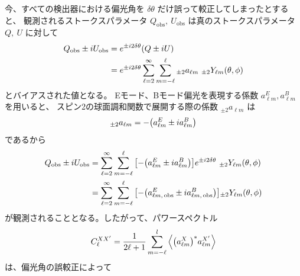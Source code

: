 \documentclass[../../main.tex]{subfiles}
\begin{document}
今、すべての検出器における偏光角を $\delta \theta$ だけ誤って較正してしまったとすると、
観測されるストークスパラメータ $Q_{\mathrm{obs}},\ U_{\mathrm{obs}}$ は真のストークスパラメータ $Q,\ U$ に対して
\begin{align}
    Q_{\mathrm{obs}} \pm iU_{\mathrm{obs}} &= e^{\pm i2\delta\theta}\qty(Q \pm iU) \\
    &= e^{\pm i2\delta\theta}\sum_{\ell=2}^{\infty}\sum_{m=-\ell}^{\ell} {}_{\pm 2}a_{\ell m}\ {}_{\pm 2}Y_{\ell m}(\theta, \phi)
\end{align}
とバイアスされた値となる。\cite{so:Keating_2013}\cite{so:Kaufman_2014}
Eモード、Bモード偏光を表現する係数 $a_{\ell m}^{E}, a_{\ell m}^{B}$ を用いると、
スピン2の球面調和関数で展開する際の係数 ${}_{\pm 2}a_{\ell m}$ は
\begin{equation}
    {}_{\pm 2}a_{\ell m} = -\qty(a_{\ell m}^{E} \pm i a_{\ell m}^{B})
\end{equation}
であるから
\begin{align}
    Q_{\mathrm{obs}} \pm iU_{\mathrm{obs}} &= \sum_{\ell=2}^{\infty}\sum_{m=-\ell}^{\ell} \qty[-\qty(a_{\ell m}^{E} \pm i a_{\ell m}^{B})]e^{\pm i2\delta\theta}\ {}_{\pm 2}Y_{\ell m}(\theta, \phi) \\
    &= \sum_{\ell=2}^{\infty}\sum_{m=-\ell}^{\ell} \qty[-\qty(a_{\ell m,\,\mathrm{obs}}^{E} \pm i a_{\ell m,\,\mathrm{obs}}^{B})] {}_{\pm2}Y_{\ell m}(\theta, \phi)
\end{align}
が観測されることとなる。したがって、パワースペクトル
\begin{equation}
    C_{\ell}^{XX'} = \dfrac{1}{2\ell+1}\sum_{m=-\ell}^{l}\left\langle \qty(a_{\ell m}^{X})^{*} a_{\ell m}^{X'} \right\rangle
\end{equation}
は、偏光角の誤較正によって
\end{document}
